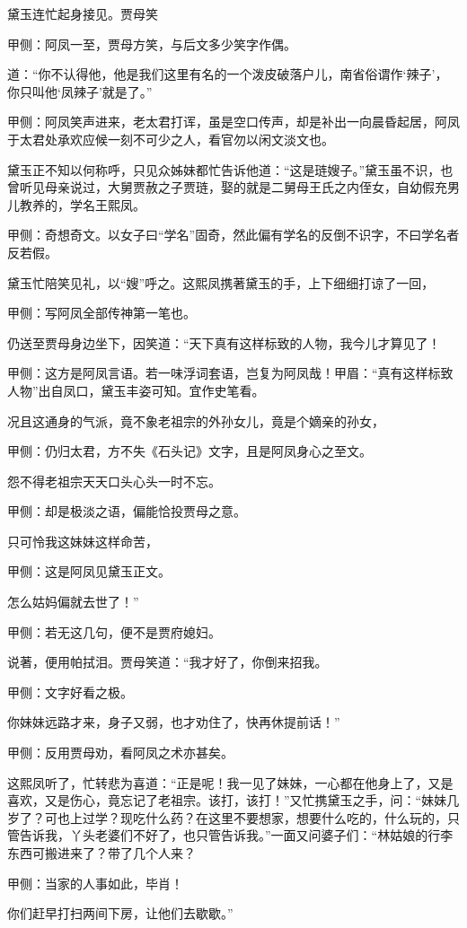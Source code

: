 \begin{parag}
    黛玉连忙起身接见。贾母笑\begin{note}甲侧：阿凤一至，贾母方笑，与后文多少笑字作偶。\end{note}道：“你不认得他，他是我们这里有名的一个泼皮破落户儿，南省俗谓作‘辣子’，你只叫他‘凤辣子’就是了。”\begin{note}甲侧：阿凤笑声进来，老太君打诨，虽是空口传声，却是补出一向晨昏起居，阿凤于太君处承欢应候一刻不可少之人，看官勿以闲文淡文也。\end{note}黛玉正不知以何称呼，只见众姊妹都忙告诉他道：“这是琏嫂子。”黛玉虽不识，也曾听见母亲说过，大舅贾赦之子贾琏，娶的就是二舅母王氏之内侄女，自幼假充男儿教养的，学名王熙凤。\begin{note}甲侧：奇想奇文。以女子曰“学名”固奇，然此偏有学名的反倒不识字，不曰学名者反若假。\end{note}黛玉忙陪笑见礼，以“嫂”呼之。这熙凤携著黛玉的手，上下细细打谅了一回，\begin{note}甲侧：写阿凤全部传神第一笔也。\end{note}仍送至贾母身边坐下，因笑道：“天下真有这样标致的人物，我今儿才算见了！\begin{note}甲侧：这方是阿凤言语。若一味浮词套语，岂复为阿凤哉！甲眉：“真有这样标致人物”出自凤口，黛玉丰姿可知。宜作史笔看。\end{note}况且这通身的气派，竟不象老祖宗的外孙女儿，竟是个嫡亲的孙女，\begin{note}甲侧：仍归太君，方不失《石头记》文字，且是阿凤身心之至文。\end{note}怨不得老祖宗天天口头心头一时不忘。\begin{note}甲侧：却是极淡之语，偏能恰投贾母之意。\end{note}只可怜我这妹妹这样命苦，\begin{note}甲侧：这是阿凤见黛玉正文。\end{note}怎么姑妈偏就去世了！”\begin{note}甲侧：若无这几句，便不是贾府媳妇。\end{note}说著，便用帕拭泪。贾母笑道：“我才好了，你倒来招我。\begin{note}甲侧：文字好看之极。\end{note}你妹妹远路才来，身子又弱，也才劝住了，快再休提前话！”\begin{note}甲侧：反用贾母劝，看阿凤之术亦甚矣。\end{note}这熙凤听了，忙转悲为喜道：“正是呢！我一见了妹妹，一心都在他身上了，又是喜欢，又是伤心，竟忘记了老祖宗。该打，该打！”又忙携黛玉之手，问：“妹妹几岁了？可也上过学？现吃什么药？在这里不要想家，想要什么吃的，什么玩的，只管告诉我，丫头老婆们不好了，也只管告诉我。”一面又问婆子们：“林姑娘的行李东西可搬进来了？带了几个人来？\begin{note}甲侧：当家的人事如此，毕肖！\end{note}你们赶早打扫两间下房，让他们去歇歇。”
\end{parag}



